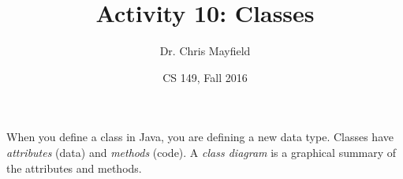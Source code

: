 \documentclass[12pt]{article}
\title{Activity 10: Classes}
\author{Dr. Chris Mayfield}
\date{CS 149, Fall 2016}
\begin{document}
\maketitle

When you define a class in Java, you are defining a new data type.
Classes have \emph{attributes} (data) and \emph{methods} (code).
A \emph{class diagram} is a graphical summary of the attributes and methods.



\newpage

\newpage

\end{document}
